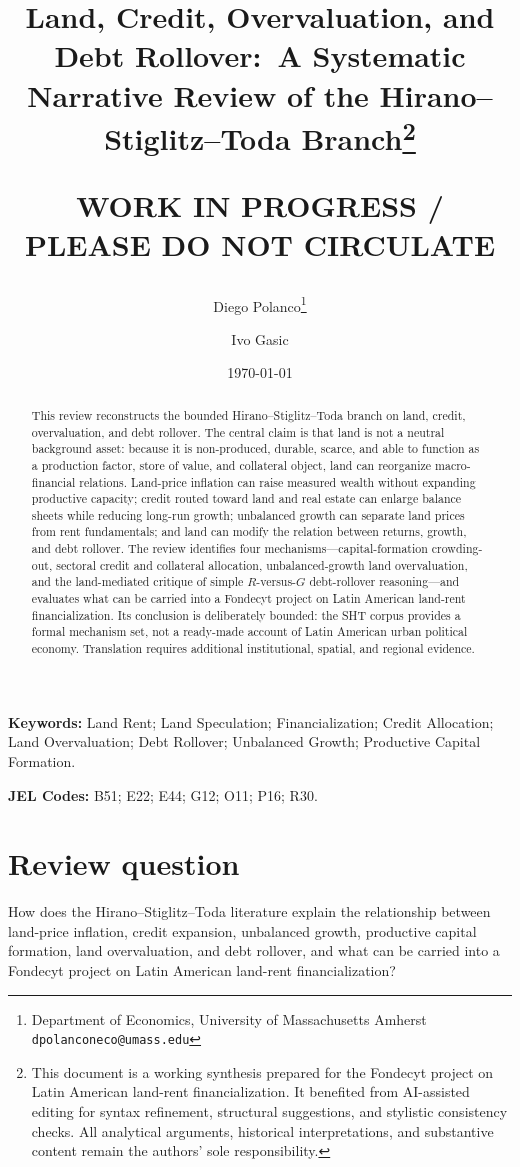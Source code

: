 \documentclass[11pt]{article}
\title{Land, Credit, Overvaluation, and Debt Rollover:\
A Systematic Narrative Review of the Hirano--Stiglitz--Toda Branch\thanks{This document is a working synthesis prepared for the Fondecyt project on Latin American land-rent financialization. It benefited from AI-assisted editing for syntax refinement, structural suggestions, and stylistic consistency checks. All analytical arguments, historical interpretations, and substantive content remain the authors' sole responsibility.}\\
\begin{large}
\textbf{WORK IN PROGRESS / PLEASE DO NOT CIRCULATE}
\end{large}
}
\author{Diego Polanco\thanks{Department of Economics, University of Massachusetts Amherst\\
\texttt{dpolanconeco@umass.edu}} \and Ivo Gasic}
\date{\today}
\begin{document}
\maketitle

\begin{abstract}
This review reconstructs the bounded Hirano--Stiglitz--Toda branch on land, credit, overvaluation, and debt rollover. The central claim is that land is not a neutral background asset: because it is non-produced, durable, scarce, and able to function as a production factor, store of value, and collateral object, land can reorganize macro-financial relations. Land-price inflation can raise measured wealth without expanding productive capacity; credit routed toward land and real estate can enlarge balance sheets while reducing long-run growth; unbalanced growth can separate land prices from rent fundamentals; and land can modify the relation between returns, growth, and debt rollover. The review identifies four mechanisms---capital-formation crowding-out, sectoral credit and collateral allocation, unbalanced-growth land overvaluation, and the land-mediated critique of simple \(R\)-versus-\(G\) debt-rollover reasoning---and evaluates what can be carried into a Fondecyt project on Latin American land-rent financialization. Its conclusion is deliberately bounded: the SHT corpus provides a formal mechanism set, not a ready-made account of Latin American urban political economy. Translation requires additional institutional, spatial, and regional evidence.
\end{abstract}

\vspace{1cm}

\noindent\textbf{Keywords:} Land Rent; Land Speculation; Financialization; Credit Allocation; Land Overvaluation; Debt Rollover; Unbalanced Growth; Productive Capital Formation.

\noindent\textbf{JEL Codes:} B51; E22; E44; G12; O11; P16; R30.

\pagebreak

\section*{Review question}

How does the Hirano--Stiglitz--Toda literature explain the relationship between land-price inflation, credit expansion, unbalanced growth, productive capital formation, land overvaluation, and debt rollover, and what can be carried into a Fondecyt project on Latin American land-rent financialization?
\end{document}
